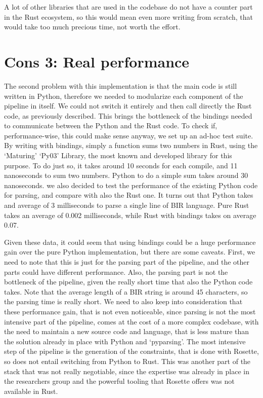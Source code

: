 A lot of other libraries that are used in the codebase do not have a counter
part in the Rust ecosystem, so this would mean even more writing from scratch,
that would take too much precious time, not worth the effort.

\section[Real performance]{Cons 3: Real performance}
The second problem with this implementation is that the main code is still written
in Python, therefore we needed to modularize each component of the pipeline in
itself. We could not switch it entirely and then call directly the Rust code, as
previously described. This brings the bottleneck of the bindings needed to communicate
between the Python and the Rust code. To check if, performance-wise, this could
make sense anyway, we set up an ad-hoc test suite. By writing with bindings, simply
a function sums two numbers in Rust, using the `Maturing' `Py03' Library, the most
known and developed library for this purpose. To do just so, it takes around 10 seconds
for each compile, and 11 nanoseconds to sum two numbers. Python to do a simple sum
takes around 30 nanoseconds. we also decided to test the performance of the
existing Python code for parsing, and compare with also the Rust one. It turns
out that Python takes and average of 3 milliseconds to parse a single line of
BIR language. Pure Rust takes an average of 0.002 milliseconds, while Rust with
bindings takes on average 0.07.

Given these data, it could seem that using bindings could be a huge performance gain
over the pure Python implementation, but there are some caveats. First, we need
to note that this is just for the parsing part of the pipeline, and the other parts
could have different performance. Also, the parsing part is not the bottleneck of
the pipeline, given the really short time that also the Python code takes. Note that
the average length of a BIR string is around 45 characters, so the parsing time
is really short. We need to also keep into consideration that these performance gain,
that is not even noticeable, since parsing is not the most intensive part of the
pipeline, comes at the cost of a more complex codebase, with the need to maintain
a new source code and language, that is less mature than the solution already in
place with Python and `pyparsing'. The most intensive step of the pipeline is the
generation of the constraints, that is done with Rosette, so does not entail switching
from Python to Rust. This was another part of the stack that was not really
negotiable, since the expertise was already in place in the researchers group and
the powerful tooling that Rosette offers was not available in Rust.

